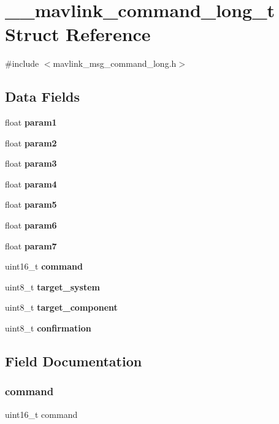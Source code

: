 \section{\+\_\+\+\_\+mavlink\+\_\+command\+\_\+long\+\_\+t Struct Reference}
\label{struct____mavlink__command__long__t}


{\ttfamily \#include $<$mavlink\+\_\+msg\+\_\+command\+\_\+long.\+h$>$}

\subsection*{Data Fields}
\begin{DoxyCompactItemize}
\item 
float \textbf{ param1}
\item 
float \textbf{ param2}
\item 
float \textbf{ param3}
\item 
float \textbf{ param4}
\item 
float \textbf{ param5}
\item 
float \textbf{ param6}
\item 
float \textbf{ param7}
\item 
uint16\+\_\+t \textbf{ command}
\item 
uint8\+\_\+t \textbf{ target\+\_\+system}
\item 
uint8\+\_\+t \textbf{ target\+\_\+component}
\item 
uint8\+\_\+t \textbf{ confirmation}
\end{DoxyCompactItemize}


\subsection{Field Documentation}
\mbox{\label{struct____mavlink__command__long__t_a4635796d5c7e7a2639b11dfe83718acc}} 
\subsubsection{command}
{\footnotesize\ttfamily uint16\+\_\+t command}

\mbox{\label{struct____mavlink__command__long__t_adfe068cde399fb5f9bc2bb99a157511a}} 

